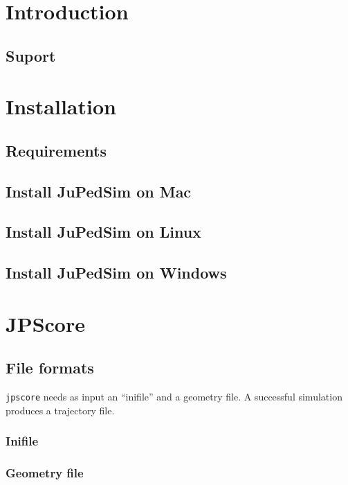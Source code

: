 \documentclass[%
paper=A4,					%
twoside=true,				%
openright,					%
parskip=full,				%
chapterprefix=true,			%
11pt,						%
headings=normal,			%
bibliography=totoc,			%
listof=totoc,				%
titlepage=on,				%
captions=tableabove,		%
draft=false,				%
]{scrreprt}%
\begin{document}
\chapter{Introduction}

 \newpage
\section{Suport}

\newpage
\chapter{Installation}
\section{Requirements}

\newpage
\section{Install JuPedSim on Mac}

\newpage
\section{Install JuPedSim on Linux}

\newpage
\section{Install JuPedSim on Windows}

\newpage

 \chapter{JPScore}
\section{File formats}
\texttt{jpscore} needs as input an ``inifile'' and a geometry file. A successful simulation produces a trajectory file.

\subsection{Inifile}

\newpage
\subsection{Geometry file}
\label{sec:geo}

\newpage
\end{document}
